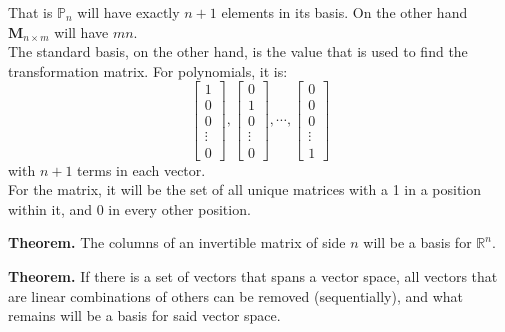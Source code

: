 \documentclass[nobib]{tufte-handout}
\begin{document}
That is $\mathbb{P}_n$ will have exactly $n+1$ elements in its basis. On the other hand $\mathbf{M}_{n\times m}$ will have $mn$.\\
The standard basis, on the other hand, is the value that is used to find the transformation matrix. For polynomials, it is:
\begin{equation*}
    \begin{bmatrix}
        1\\
        0\\
        0\\
        \vdots\\
        0
    \end{bmatrix},
    \begin{bmatrix}
        0\\
        1\\
        0\\
        \vdots\\
        0
    \end{bmatrix},\cdots,
    \begin{bmatrix}
        0\\
        0\\
        0\\
        \vdots\\
        1
    \end{bmatrix}
\end{equation*}
with $n+1$ terms in each vector.\\
For the matrix, it will be the set of all unique matrices with a 1 in a position within it, and 0 in every other position.\\
\begin{center}
    \textbf{Theorem.} The columns of an invertible matrix of side $n$ will be a basis for $\mathbb{R}^n$.
\end{center}
\begin{center}
    \textbf{Theorem.} If there is a set of vectors that spans a vector space, all vectors that are linear combinations of others can be removed (sequentially), and what remains will be a basis for said vector space.
\end{center}
\end{document}
